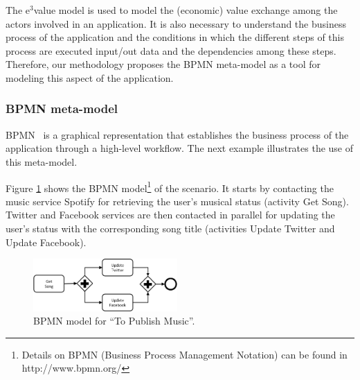 The e$^3$value  model is used to model the (economic) value exchange among the actors involved in an application. It is also necessary to understand the business process of the application and the conditions in which the different steps of this process are executed input/out data and the dependencies among these steps. Therefore, our methodology proposes the BPMN meta-model as a tool for modeling this aspect of the application.


\subsubsection{BPMN meta-model}%
BPMN~\cite{BPMN}  is a graphical representation that establishes the business process of the application through a high-level workflow. 
The next example illustrates the use of this meta-model.

\begin{example}\label{ex:toPublicMusicBPMN}
Figure \ref{fig:CIM:tpmbpmn} shows the BPMN model\footnote{Details on BPMN (Business Process Management Notation) can be found in http://www.bpmn.org/} of the scenario. 
It starts by contacting the music service Spotify for retrieving the user's  musical status (activity {\sf Get Song}). 
Twitter and Facebook services are then contacted in parallel for updating the user's status with the corresponding song title (activities {\sf Update Twitter} and {\sf Update Facebook}).
\end{example}
%
\begin{figure}[htpb]
\center
\includegraphics[width=0.49\textwidth]{figs/SC.pdf}
\caption{\label{fig:CIM:tpmbpmn} BPMN model for ``To Publish Music''.}
\end{figure}

